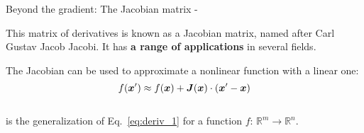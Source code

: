 \begin{frame}[t,allowframebreaks]{
    Beyond the gradient: The Jacobian matrix -}
    \vspace{0.2cm}

    This matrix of derivatives is known as a
    \Gls{Jacobian matrix}, 
    named after Carl Gustav Jacob Jacobi.
    It has {\bf a range of applications} in several fields.\\

    \framebreak


    The Jacobian can be used to approximate a nonlinear 
    function with a linear one:
    \begin{equation}
        f(\boldsymbol{x}^\prime) \approx 
        f(\boldsymbol{x}) + \boldsymbol{J}(\boldsymbol{x}) \cdot (\boldsymbol{x}^\prime - \boldsymbol{x})   
        \label{eq:jacobian_linearization_1}
    \end{equation}\\
    is the generalization of Eq.~\ref{eq:deriv_1}
    for a function $f$: $\mathbb{R}^m \rightarrow \mathbb{R}^n$.


\end{frame}
